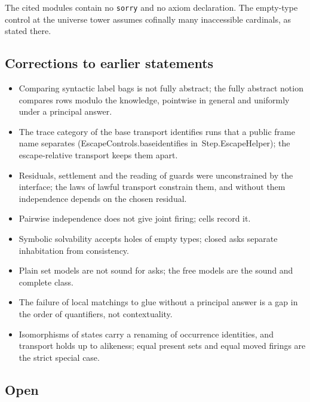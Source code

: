 \documentclass[11pt]{article}
\theoremstyle{remark}
\newcommand{\lean}[1]{{\ttfamily\def\_{\textunderscore\allowbreak}#1}}
\newcommand{\inmod}[1]{in~{\ttfamily\def\_{\textunderscore\allowbreak}#1}}
\begin{document}
The cited modules contain no \texttt{sorry} and no axiom declaration. The empty-type control at the universe tower assumes
cofinally many inaccessible cardinals, as stated there.

\subsection{Corrections to earlier statements}
\begin{itemize}
\item Comparing syntactic label bags is not fully abstract; the fully abstract notion compares rows modulo
  the knowledge, pointwise in general and uniformly under a principal answer.
\item The trace category of the base transport identifies runs that a public frame name separates
  (\lean{EscapeControls.base\_identifies} \inmod{Step.EscapeHelper}); the escape-relative
  transport keeps them apart.
\item Residuals, settlement and the reading of guards were unconstrained by the interface; the laws of
  lawful transport constrain them, and without them independence depends on the chosen residual.
\item Pairwise independence does not give joint firing; cells record it.
\item Symbolic solvability accepts holes of empty types; closed asks separate inhabitation from
  consistency.
\item Plain set models are not sound for asks; the free models are the sound and complete class.
\item The failure of local matchings to glue without a principal answer is a gap in the order of
  quantifiers, not contextuality.
\item Isomorphisms of states carry a renaming of occurrence identities, and transport holds up to
  alikeness; equal present sets and equal moved firings are the strict special case.
\end{itemize}

\subsection{Open}
\end{document}
